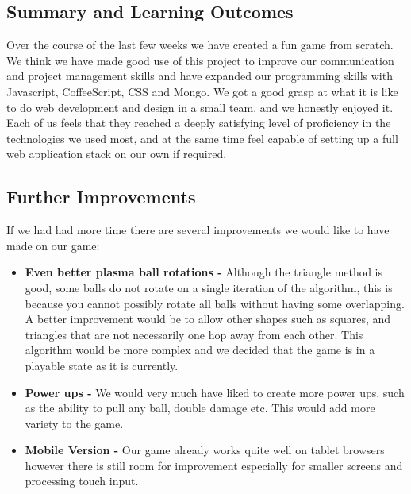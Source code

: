 \documentclass[a4wide, 11pt]{article}
\begin{document}
\subsection{Summary and Learning Outcomes}
Over the course of the last few weeks we have created a fun game from scratch.
We think we have made good use of this project to improve our communication and project management skills and have expanded our programming skills with Javascript, CoffeeScript, CSS and Mongo.
We got a good grasp at what it is like to do web development and design in a small team, and we honestly enjoyed it. Each of us feels that they reached a deeply satisfying level of proficiency in the technologies we used most, and at the same time feel capable of setting up a full web application stack on our own if required.

\subsection{Further Improvements}
If we had had more time there are several improvements we would like to have made on our game:
\begin{itemize}
    \item\textbf{Even better plasma ball rotations -} Although the triangle method is good, some balls do not rotate on a single iteration of the algorithm, this is because you cannot possibly rotate all balls without having some overlapping. A better improvement would be to allow other shapes such as squares, and triangles that are not necessarily one hop away from each other. This algorithm would be more complex and we decided that the game is in a playable state as it is currently.
    \item\textbf{Power ups -} We would very much have liked to create more power ups, such as the ability to pull any ball, double damage etc. This would add more variety to the game.
    \item\textbf{Mobile Version -} Our game already works quite well on tablet browsers however there is still room for improvement especially for smaller screens and processing touch input.
    
\end{itemize}
\end{document}
